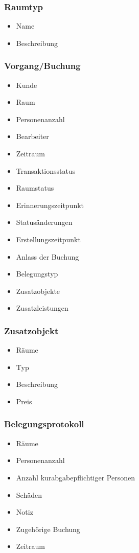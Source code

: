 \subsubsection{Raumtyp}

\begin{itemize}
\item Name
\item Beschreibung
\end{itemize}

\subsubsection{Vorgang/Buchung}

\begin{itemize}
\item Kunde
\item Raum
\item Personenanzahl
\item Bearbeiter
\item Zeitraum
\item Transaktionsstatus
\item Raumstatus
\item Erinnerungszeitpunkt
\item Statusänderungen
\item Erstellungszeitpunkt
\item Anlass der Buchung
\item Belegungstyp
\item Zusatzobjekte
\item Zusatzleistungen
\end{itemize}

\subsubsection{Zusatzobjekt}

\begin{itemize}
\item Räume
\item Typ
\item Beschreibung
\item Preis
\end{itemize}

\subsubsection{Belegungsprotokoll}

\begin{itemize}
\item Räume
\item Personenanzahl
\item Anzahl kurabgabepflichtiger Personen
\item Schäden
\item Notiz
\item Zugehörige Buchung
\item Zeitraum
\end{itemize}

